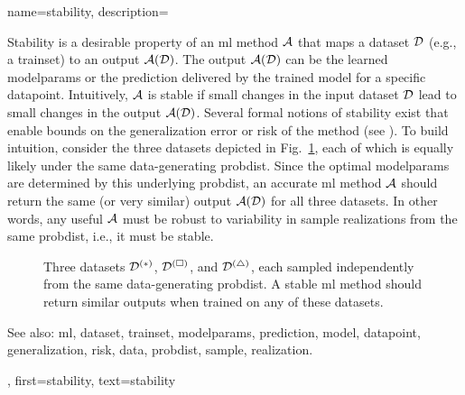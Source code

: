 {name={stability},
	description={Stability is a desirable property of an \gls{ml} method $\mathcal{A}$ that maps a 
		\gls{dataset} $\mathcal{D}$ (e.g., a \gls{trainset}) to an output $\mathcal{A}(\mathcal{D})$. The output 
		$\mathcal{A}(\mathcal{D})$ can be the learned \gls{modelparams} or the \gls{prediction} delivered 
		by the trained \gls{model} for a specific \gls{datapoint}. Intuitively, $\mathcal{A}$ is 
		stable if small changes in the input \gls{dataset} $\mathcal{D}$ lead to small changes in the 
		output $\mathcal{A}(\mathcal{D})$. Several formal notions of stability exist that enable bounds 
		on the \gls{generalization} error or \gls{risk} of the method (see \cite[Ch.~13]{ShalevMLBook}).
		To build intuition, consider the three \glspl{dataset} depicted in Fig.~\ref{fig_three_data_stability}, each 
		of which is equally likely under the same \gls{data}-generating \gls{probdist}. Since the 
		optimal \gls{modelparams} are determined by this underlying \gls{probdist}, an accurate 
		\gls{ml} method $\mathcal{A}$ should return the same (or very similar) output $\mathcal{A}(\mathcal{D})$ 
		for all three \glspl{dataset}. In other words, any useful $\mathcal{A}$ must be robust to 
		variability in \gls{sample} \glspl{realization} from the same \gls{probdist}, i.e., it must be stable. 
		\begin{figure}[H]
			\centering
			\caption{Three \glspl{dataset} $\mathcal{D}^{(*)}$, $\mathcal{D}^{(\square)}$, and $\mathcal{D}^{(\triangle)}$, 
				each sampled independently from the same \gls{data}-generating \gls{probdist}. A stable \gls{ml} 
				method should return similar outputs when trained on any of these \glspl{dataset}. \label{fig_three_data_stability}}
		\end{figure}
		See also: \gls{ml}, \gls{dataset}, \gls{trainset}, \gls{modelparams}, \gls{prediction}, \gls{model}, \gls{datapoint}, \gls{generalization}, \gls{risk}, \gls{data}, \gls{probdist}, \gls{sample}, \gls{realization}.}, 
	first={stability}, 
	text={stability} 
}

